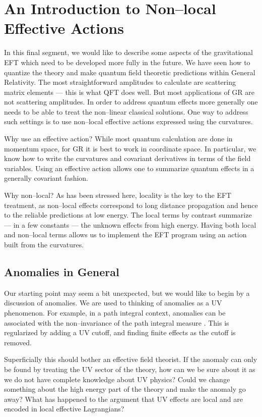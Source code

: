 \documentclass[12pt]{article}
\begin{document}
\section{An Introduction to Non--local Effective Actions}
\label{sec:anomalies}

In this final segment, we would like to describe some aspects of the gravitational EFT which need to be developed more fully in the future. We have seen how to quantize the theory and make quantum field theoretic predictions within General Relativity. The most straightforward amplitudes to calculate are scattering matrix elements --- this is what QFT does well. But most applications of GR are not scattering amplitudes. In order to address quantum effects more generally one needs to be able to treat the non--linear classical solutions. One way to address such settings is to use non--local effective actions expressed using the curvatures.

Why use an effective action? While most quantum calculation are done in momentum space, for GR it is best to work in coordinate space. In particular, we know how to write the curvatures and covariant derivatives in terms of the field variables. Using an effective action allows one to summarize quantum effects in a generally covariant fashion.

Why non--local? As has been stressed here, locality is the key to the EFT treatment, as non--local effects correspond to long distance propagation and hence to the reliable predictions at low energy. The local terms by contrast summarize --- in a few constants --- the unknown effects from high energy. Having both local and non--local terms allows us to implement the EFT program using an action built from the curvatures.

\subsection{Anomalies in General}

Our starting point may seem a bit unexpected, but we would like to begin by a discussion of anomalies. We are used to thinking of anomalies as a UV phenomenon. For example, in a path integral context, anomalies can be associated with the non--invariance of the path integral measure \cite{Fujikawa:1980vr}. This is regularized by adding a UV cutoff, and finding finite effects as the cutoff is removed.

Superficially this should bother an effective field theorist. If the anomaly can only be found by treating the UV sector of the theory, how can we be sure about it as we do not have complete knowledge about UV physics? Could we change something about the high energy part of the theory and make the anomaly go away? What has happened to the argument that UV effects are local and are encoded in local effective Lagrangians?
\end{document}
